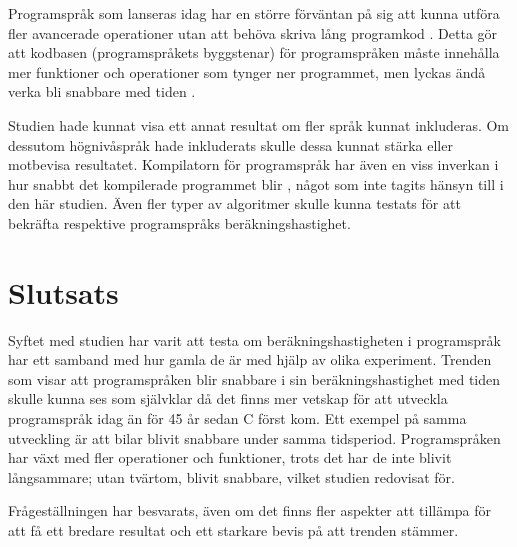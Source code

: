 \documentclass[12pt,swedish]{article}
\begin{document}
Programspråk som lanseras idag har en större förväntan på sig att kunna utföra fler avancerade operationer utan att behöva skriva lång programkod \citep{stroustrup_1997}. Detta gör att kodbasen (programspråkets byggstenar) för programspråken måste innehålla mer funktioner och operationer som tynger ner programmet, men lyckas ändå verka bli snabbare med tiden \citep{luong_2017}.

Studien hade kunnat visa ett annat resultat om fler språk kunnat inkluderas. Om dessutom högnivåspråk hade inkluderats skulle dessa kunnat stärka eller motbevisa resultatet. Kompilatorn för programspråk har även en viss inverkan i hur snabbt det kompilerade programmet blir \citep{srikant_shankar_2008}, något som inte tagits hänsyn till i den här studien. Även fler typer av algoritmer skulle kunna testats för att bekräfta respektive programspråks beräkningshastighet.


\section{Slutsats}
Syftet med studien har varit att testa om beräkningshastigheten i programspråk har ett samband med hur gamla de är med hjälp av olika experiment. Trenden som visar att programspråken blir snabbare i sin beräkningshastighet med tiden skulle kunna ses som självklar då det finns mer vetskap för att utveckla programspråk idag än för 45 år sedan C först kom. Ett exempel på samma utveckling är att bilar blivit snabbare under samma tidsperiod. Programspråken har växt med fler operationer och funktioner, trots det har de inte blivit långsammare; utan tvärtom, blivit snabbare, vilket studien redovisat för.

Frågeställningen har besvarats, även om det finns fler aspekter att tillämpa för att få ett bredare resultat och ett starkare bevis på att trenden stämmer.


\printbibliography

\end{document}
